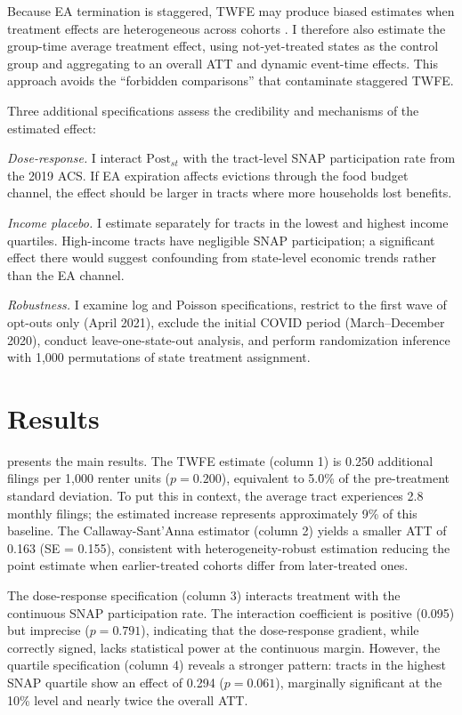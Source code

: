\documentclass[12pt]{article}
\begin{document}
Because EA termination is staggered, TWFE may produce biased estimates when treatment effects are heterogeneous across cohorts \citep{GoodmanBacon2021, deChaisemartin2020}. I therefore also estimate the \citet{CallawayS2021} group-time average treatment effect, using not-yet-treated states as the control group and aggregating to an overall ATT and dynamic event-time effects. This approach avoids the ``forbidden comparisons'' that contaminate staggered TWFE.

Three additional specifications assess the credibility and mechanisms of the estimated effect:

\textit{Dose-response.} I interact $\text{Post}_{st}$ with the tract-level SNAP participation rate from the 2019 ACS. If EA expiration affects evictions through the food budget channel, the effect should be larger in tracts where more households lost benefits.

\textit{Income placebo.} I estimate  separately for tracts in the lowest and highest income quartiles. High-income tracts have negligible SNAP participation; a significant effect there would suggest confounding from state-level economic trends rather than the EA channel.

\textit{Robustness.} I examine log and Poisson specifications, restrict to the first wave of opt-outs only (April 2021), exclude the initial COVID period (March--December 2020), conduct leave-one-state-out analysis, and perform randomization inference with 1,000 permutations of state treatment assignment.

\section{Results}



 presents the main results. The TWFE estimate (column 1) is 0.250 additional filings per 1,000 renter units ($p = 0.200$), equivalent to 5.0\% of the pre-treatment standard deviation. To put this in context, the average tract experiences 2.8 monthly filings; the estimated increase represents approximately 9\% of this baseline. The Callaway-Sant'Anna estimator (column 2) yields a smaller ATT of 0.163 (SE = 0.155), consistent with heterogeneity-robust estimation reducing the point estimate when earlier-treated cohorts differ from later-treated ones.

The dose-response specification (column 3) interacts treatment with the continuous SNAP participation rate. The interaction coefficient is positive (0.095) but imprecise ($p = 0.791$), indicating that the dose-response gradient, while correctly signed, lacks statistical power at the continuous margin. However, the quartile specification (column 4) reveals a stronger pattern: tracts in the highest SNAP quartile show an effect of 0.294 ($p = 0.061$), marginally significant at the 10\% level and nearly twice the overall ATT.
\end{document}
